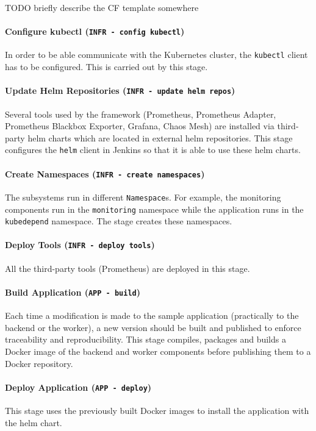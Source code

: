 TODO briefly describe the CF template somewhere


\paragraph{Configure kubectl (\texttt{INFR - config kubectl})} In order to be able communicate with the Kubernetes cluster, the \texttt{kubectl} client has to be configured. This is carried out by this stage.

\paragraph{Update Helm Repositories (\texttt{INFR - update helm repos})} Several tools used by the framework (Prometheus, Prometheus Adapter, Prometheus Blackbox Exporter, Grafana, Chaos Mesh) are installed via third-party helm charts which are located in external helm repositories. This stage configures the \texttt{helm} client in Jenkins so that it is able to use these helm charts.

\paragraph{Create Namespaces (\texttt{INFR - create namespaces})} The subsystems run in different \texttt{Namespace}s. For example, the monitoring components run in the \texttt{monitoring} namespace while the application runs in the \texttt{kubedepend} namespace. The stage creates these namespaces.

\paragraph{Deploy Tools (\texttt{INFR - deploy tools})} All the third-party tools (\eg Prometheus) are deployed in this stage.

\paragraph{Build Application (\texttt{APP - build})} Each time a modification is made to the sample application (practically to the backend or the worker), a new version should be built and published to enforce traceability and reproducibility. This stage compiles, packages and builds a Docker image of the backend and worker components before publishing them to a Docker repository.

\paragraph{Deploy Application (\texttt{APP - deploy})} This stage uses the previously built Docker images to install the application with the helm chart.

